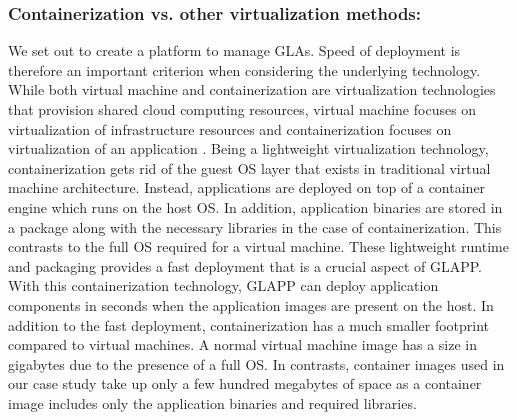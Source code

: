 \documentclass{seal_thesis}
\begin{document}
\subsubsection{Containerization vs. other virtualization methods:}
We set out to create a platform to manage GLAs.
Speed of deployment is therefore an important criterion when considering the underlying technology.
While both virtual machine and containerization are virtualization technologies that provision shared cloud computing resources, virtual machine focuses on virtualization of infrastructure resources and containerization focuses on virtualization of an application \cite{pahl2015containerisation}.
Being a lightweight virtualization technology, containerization gets rid of the guest OS layer that exists in traditional virtual machine architecture.
Instead, applications are deployed on top of a container engine which runs on the host OS.
In addition, application binaries are stored in a package along with the necessary libraries in the case of containerization.
This contrasts to the full OS required for a virtual machine.
These lightweight runtime and packaging provides a fast deployment that is a crucial aspect of GLAPP.
With this containerization technology, GLAPP can deploy application components in seconds when the application images are present on the host.
In addition to the fast deployment, containerization has a much smaller footprint compared to virtual machines.
A normal virtual machine image has a size in gigabytes due to the presence of a full OS.
In contrasts, container images used in our case study take up only a few hundred megabytes of space as a container image includes only the application binaries and required libraries.



\end{document}
